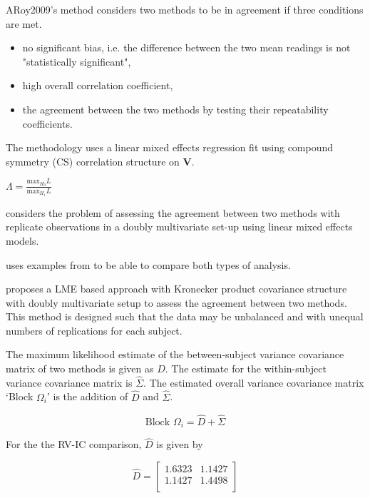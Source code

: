 \documentclass[12pt, a4paper]{report}
\theoremstyle{plain}
\theoremstyle{definition}
\theoremstyle{remark}
\begin{document}
	ARoy2009's method considers two methods to be in agreement if three
	conditions are met.
	
	\begin{itemize}
		\item no significant bias, i.e. the difference between the two
		mean readings is not "statistically significant",
		
		\item high overall correlation coefficient,
		
		\item the agreement between the two methods by testing their
		repeatability coefficients.
		
	\end{itemize}
	
	The methodology uses a linear mixed effects regression fit using
	compound symmetry (CS) correlation structure on \textbf{V}.
	
	
	$\Lambda = \frac{\mbox{max}_{H_{0}}L}{\mbox{max}_{H_{1}}L}$
	
	\newpage
	
	\citet{AARoy20092009} considers the problem of assessing the agreement
	between two methods with replicate observations in a doubly
	multivariate set-up using linear mixed effects models.
	
	\citet{AARoy20092009} uses examples from \citet{BA86} to be able to
	compare both types of analysis.
	
	\citet{AARoy20092009} proposes a LME based approach with Kronecker
	product covariance structure with doubly multivariate setup to
	assess the agreement between two methods. This method is designed
	such that the data may be unbalanced and with unequal numbers of
	replications for each subject.
	
	The maximum likelihood estimate of the between-subject variance
	covariance matrix of two methods is given as $D$. The estimate for
	the within-subject variance covariance matrix is $\hat{\Sigma}$.
	The estimated overall variance covariance matrix `Block
	$\Omega_{i}$' is the addition of $\hat{D}$ and $\hat{\Sigma}$.
	
	
	\begin{equation}
	\mbox{Block  }\Omega_{i} = \hat{D} + \hat{\Sigma}
	\end{equation}
	
	For the the RV-IC comparison, $\hat{D}$ is given by
	
	
	\begin{equation}
	\hat{D}= \left[ \begin{array}{cc}
	1.6323 & 1.1427  \\
	1.1427 & 1.4498 \\
	\end{array} \right]
	\end{equation}
	
\end{document}

